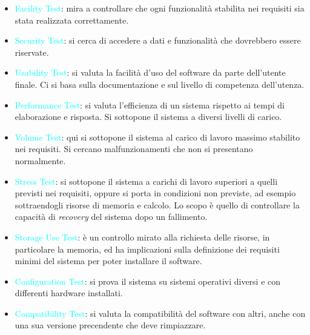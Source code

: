 \begin{itemize}
    \item \textcolor{cyan}{Facility Test}: mira a controllare che ogni funzionalità stabilita nei requisiti
        sia stata realizzata correttamente.
    \item \textcolor{cyan}{Security Test}: si cerca di accedere a dati e funzionalità che dovrebbero essere riservate.
    \item \textcolor{cyan}{Usability Test}: si valuta la facilità d'uso del software da parte dell'utente finale. Ci si basa
        sulla documentazione e sul livello di competenza dell'utenza.
    \item \textcolor{cyan}{Performance Test}: si valuta l'efficienza di un sistema rispetto ai tempi di elaborazione
        e risposta. Si sottopone il sistema a diversi livelli di carico.
    \item \textcolor{cyan}{Volume Test}: qui si sottopone il sistema al carico di lavoro massimo stabilito
        nei requisiti. Si cercano malfunzionamenti che non si presentano normalmente.
    \item \textcolor{cyan}{Stress Test}: si sottopone il sistema a carichi di lavoro superiori a quelli previsti
        nei requisiti, oppure si porta in condizioni non previste, ad esempio sottraendogli risorse
        di memoria e calcolo. Lo scopo è quello di controllare la capacità di \emph{recovery}
        del sistema dopo un fallimento.
    \item \textcolor{cyan}{Storage Use Test}: è un controllo mirato alla richiesta delle risorse, in particolare
        la memoria, ed ha implicazioni sulla definizione dei requisiti minimi del sistema per poter installare il software.
    \item \textcolor{cyan}{Configuration Test}: si prova il sistema su sistemi operativi diversi e con
        differenti hardware installati.
    \item \textcolor{cyan}{Compatibility Test}: si valuta la compatibilità del software con altri, anche
        con una sua versione precendente che deve rimpiazzare.
\end{itemize}
